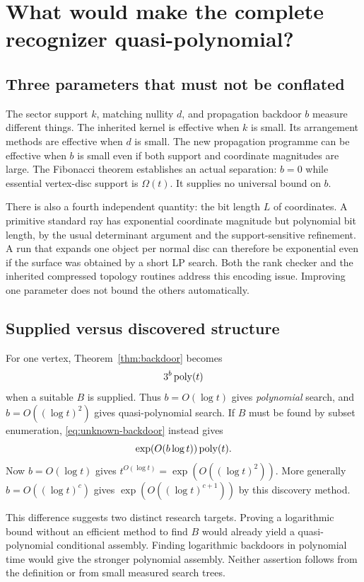 \section{What would make the complete recognizer quasi-polynomial?}\label{sec:complexity}

\subsection{Three parameters that must not be conflated}

The sector support $k$, matching nullity $d$, and propagation backdoor $b$ measure different things. The inherited kernel is effective when $k$ is small. Its arrangement methods are effective when $d$ is small. The new propagation programme can be effective when $b$ is small even if both support and coordinate magnitudes are large. The Fibonacci theorem establishes an actual separation: $b=0$ while essential vertex-disc support is $\Omega(t)$. It supplies no universal bound on $b$.

There is also a fourth independent quantity: the bit length $L$ of coordinates. A primitive standard ray has exponential coordinate magnitude but polynomial bit length, by the usual determinant argument and the support-sensitive refinement. A run that expands one object per normal disc can therefore be exponential even if the surface was obtained by a short LP search. Both the rank checker and the inherited compressed topology routines address this encoding issue. Improving one parameter does not bound the others automatically.

\subsection{Supplied versus discovered structure}

For one vertex, Theorem~\ref{thm:backdoor} becomes
\[
 3^b\operatorname{poly}(t)
\]
when a suitable $B$ is supplied. Thus $b=O(\log t)$ gives \emph{polynomial} search, and $b=O((\log t)^2)$ gives quasi-polynomial search. If $B$ must be found by subset enumeration, \eqref{eq:unknown-backdoor} instead gives
\[
 \exp(O(b\log t))\operatorname{poly}(t).
\]
Now $b=O(\log t)$ gives $t^{O(\log t)}=\exp(O((\log t)^2))$. More generally $b=O((\log t)^c)$ gives $\exp(O((\log t)^{c+1}))$ by this discovery method.

This difference suggests two distinct research targets. Proving a logarithmic bound without an efficient method to find $B$ would already yield a quasi-polynomial conditional assembly. Finding logarithmic backdoors in polynomial time would give the stronger polynomial assembly. Neither assertion follows from the definition or from small measured search trees.


